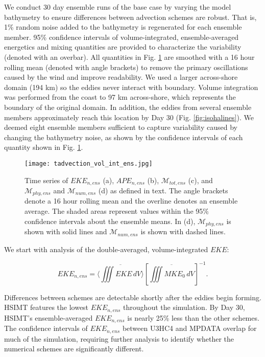 \documentclass[draft]{agujournal2019}
\begin{document}
We conduct 30 day ensemble runs of the base case by varying the model bathymetry to ensure differences between advection schemes are robust. That is, 1\% random noise added to the bathymetry is regenerated for each ensemble member. 95\% confidence intervals of volume-integrated, ensemble-averaged energetics and mixing quantities are provided to characterize the variability (denoted with an overbar). All quantities in Fig. \ref{fig:tadv_vol_int} are smoothed with a 16 hour rolling mean (denoted with angle brackets) to remove the primary oscillations caused by the wind and improve readability. We used a larger across-shore domain (194 km) so the eddies never interact with boundary. Volume integration was performed from the coast to 97 km across-shore, which represents the boundary of the original domain. In addition, the eddies from several ensemble members approximately reach this location by Day 30 (Fig. \ref{fig:isohalines}). We deemed eight ensemble members sufficient to capture variability caused by changing the bathymetry noise, as shown by the confidence intervals of each quantity shown in Fig. \ref{fig:tadv_vol_int}. 

\begin{figure}[t]
    \begin{center} 
    \texttt{[image: tadvection\_vol\_int\_ens.jpg]}\\
    \caption{Time series of $EKE_{n,ens}$ (a), $APE_{n,ens}$ (b), $\mathcal{M}_{tot, ens}$ (c), and $\mathcal{M}_{phy,ens}$ and $\mathcal{M}_{num,ens}$ (d) as defined in text. The angle brackets denote a 16 hour rolling mean and the overline denotes an ensemble average. The shaded areas represent values within the 95\% confidence intervals about the ensemble means. In (d), $\mathcal{M}_{phy,ens}$ is shown with solid lines and $\mathcal{M}_{num,ens}$ is shown with dashed lines.} \label{fig:tadv_vol_int}
     \end{center} 
\end{figure}

We start with analysis of the double-averaged, volume-integrated $EKE$: 
\begin{linenomath*}
    \begin{equation}
        EKE_{n,ens} = \langle \overline{\iiint EKE \, dV }\rangle \left[\overline{\iiint MKE_0 \, dV}\right]^{-1}.
    \end{equation}
\end{linenomath*}
Differences between schemes are detectable shortly after the eddies begin forming. HSIMT features the lowest $EKE_{n,ens}$ throughout the simulation. By Day 30, HSIMT's ensemble-averaged $EKE_{n,ens}$ is nearly 25\% less than the other schemes. The confidence intervals of $EKE_{n,ens}$ between U3HC4 and MPDATA overlap for much of the simulation, requiring further analysis to identify whether the numerical schemes are significantly different. 
\end{document}
